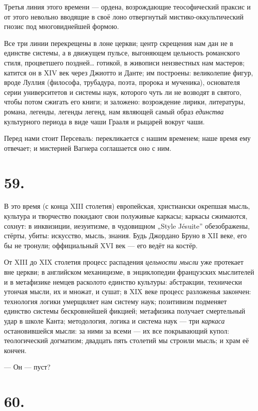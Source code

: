 \documentclass[12pt,a4paper,oneside]{book}
\begin{document}
Третья линия этого времени — ордена, возрождающие теософический праксис и от этого невольно вводящие в своё лоно отвергнутый мистико-оккультический гнозис под многовиднейшей формою.

Все три линии перекрещены в лоне церкви; центр скрещения нам дан не в единстве системы, а в движущем пульсе, выгоняющем цельность романского стиля, процветшего поздней… готикой, в живописи неизвестных нам мастеров; катится он в XIV век через Джиотто и Данте; им построены: великолепие фигур, вроде Луллия (философа, трубадура, поэта, пророка и мученика), основателя серии университетов и системы наук, которого чуть ли не возводят в святого, чтобы потом сжигать его книги; и заложено: возрождение лирики, литературы, романа, легенды, легенды легенд, нам являющей самый образ \emph{единства} культурного периода в виде чаши Грааля и рыцарей вокруг чаши.

Перед нами стоит Персеваль: перекликается с нашим временем; наше время ему отвечает; и мистерией Вагнера соглашается оно с ним.

\section*{59.}

В это время (с конца XIII столетия) европейская, христиански окрепшая мысль, культура и творчество покидают свои полуживые каркасы; каркасы сжимаются, сохнут: в инквизиции, иезуитизме, в чудовищном „Style Jésuite” обезображены, стёрты, убиты: искусство, мысль, знания. Будь Джордано Бруно в XII веке, его бы не тронули; оффициальный XVI век — его ведёт на костёр.

От XIII до XIX столетия процесс распадения \emph{цельности мысли} уже протекает вне церкви; в английском механицизме, в энциклопедии французских мыслителей и в метафизике немцев расколото единство культуры: абстракции, технически утончая мысли, их и множат, и сушат; в XIX веке процесс разложенья закончен: технология логики умерщвляет нам систему наук; позитивизм подменяет единство системы бескровнейшей фикцией; метафизика получает смертельный удар в школе Канта; методология, логика и система наук — три \emph{каркаса} остановившейся мысли: за ними за всеми — их все покрывающий купол: теологический догматизм; двадцать пять столетий мы строили мысль; и храм её кончен.

— Он — пуст?

\section*{60.}
\end{document}
